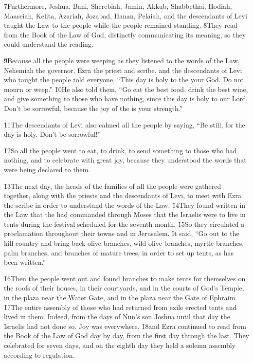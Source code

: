 \v{7}Furthermore, Jeshua, Bani, Sherebiah, Jamin, Akkub, Shabbethai, Hodiah, Maaseiah, Kelita, Azariah, Jozabad, Hanan, Pelaiah, and the descendants of Levi taught the Law to the people while the people remained standing. \v{8}They read from the Book of the Law of God, distinctly communicating its meaning, so they could understand the reading.

\v{9}Because all the people were weeping as they listened to the words of the Law, Nehemiah the governor, Ezra the priest and scribe, and the descendants of Levi who taught the people told everyone, ``This day is holy to the  your God. Do not mourn or weep.'' \v{10}He also told them, ``Go eat the best food, drink the best wine, and give something to those who have nothing, since this day is holy to our Lord. Don't be sorrowful, because the joy of the  is your strength.''

\v{11}The descendants of Levi also calmed all the people by saying, ``Be still, for the day is holy. Don't be sorrowful!''

\v{12}So all the people went to eat, to drink, to send something to those who had nothing, and to celebrate with great joy, because they understood the words that were being declared to them.

\v{13}The next day, the heads of the families of all the people were gathered together, along with the priests and the descendants of Levi, to meet with Ezra the scribe in order to understand the words of the Law. \v{14}They found written in the Law that the  had commanded through Moses that the Israelis were to live in tents during the festival scheduled for the seventh month. \v{15}So they circulated a proclamation throughout their towns and in Jerusalem. It said, ``Go out to the hill country and bring back olive branches, wild olive branches, myrtle branches, palm branches, and branches of mature trees, in order to set up tents, as has been written.''

\v{16}Then the people went out and found branches to make tents for themselves on the roofs of their houses, in their courtyards, and in the courts of God's Temple, in the plaza near the Water Gate, and in the plaza near the Gate of Ephraim. \v{17}The entire assembly of those who had returned from exile erected tents and lived in them. Indeed, from the days of Nun's son Joshua until that day the Israelis had not done so. Joy was everywhere, \v{18}and Ezra continued to read from the Book of the Law of God day by day, from the first day through the last. They celebrated for seven days, and on the eighth day they held a solemn assembly according to regulation.

